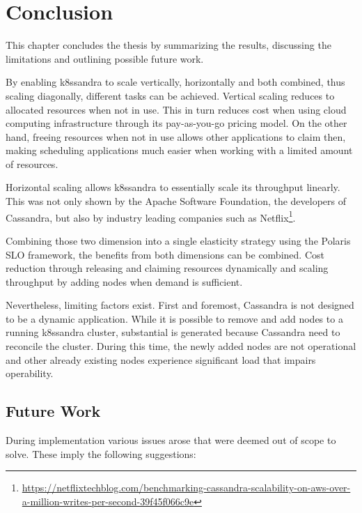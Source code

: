 \chapter{Conclusion}
\label{ch:conclusion}

This chapter concludes the thesis by summarizing the results, discussing the limitations and outlining possible future work.

By enabling k8ssandra to scale vertically, horizontally and both combined, thus scaling diagonally, different tasks can be achieved. Vertical scaling reduces to allocated resources when not in use. This in turn reduces cost when using cloud computing infrastructure through its pay-as-you-go pricing model. On the other hand, freeing resources when not in use allows other applications to claim then, making scheduling applications much easier when working with a limited amount of resources.

Horizontal scaling allows k8ssandra to essentially scale its throughput linearly. This was not only shown by the Apache Software Foundation, the developers of Cassandra, but also by industry leading companies such as Netflix\footnote{\raggedright\url{https://netflixtechblog.com/benchmarking-cassandra-scalability-on-aws-over-a-million-writes-per-second-39f45f066c9e}}.

Combining those two dimension into a single elasticity strategy using the Polaris SLO framework, the benefits from both dimensions can be combined. Cost reduction through releasing and claiming resources dynamically and scaling throughput by adding nodes when demand is sufficient.

Nevertheless, limiting factors exist. First and foremost, Cassandra is not designed to be a dynamic application. While it is possible to remove and add nodes to a running k8ssandra cluster, substantial is generated because Cassandra need to reconcile the cluster. During this time, the newly added nodes are not operational and other already existing nodes experience significant load that impairs operability.

\section{Future Work}
\label{sec:future-work}

During implementation various issues arose that were deemed out of scope to solve. These imply the following suggestions:

